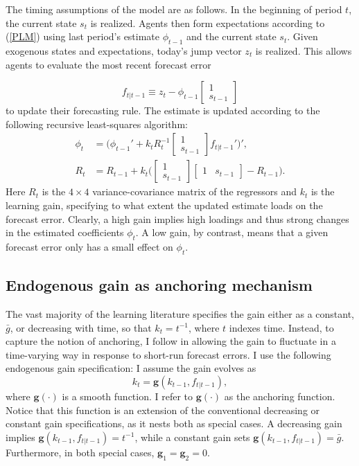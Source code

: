 \documentclass[11pt]{article}
\renewcommand{\[}{\begin{equation}}
\renewcommand{\]}{\end{equation}}
\begin{document}
The timing assumptions of the model are as follows. In the beginning of period $t$, the current state $s_t$ is realized. Agents then form expectations according to (\ref{PLM}) using last period's estimate $\phi_{t-1}$ and the current state $s_t$. Given exogenous states and expectations, today's jump vector $z_t$ is realized. This allows agents to evaluate the most recent forecast error 

\begin{equation}
f_{t|t-1} \equiv z_t - \phi_{t-1}\begin{bmatrix} 1\\ s_{t-1}\end{bmatrix} \label{fe_def}
\end{equation}
to update their forecasting rule. The estimate is updated according to the following recursive least-squares algorithm:
\begin{align}
\phi_t  & = \bigg( \phi_{t-1}' + k_t R_t^{-1}\begin{bmatrix} 1 \\ s_{t-1} \end{bmatrix}f_{t|t-1}' \bigg)' \label{RLS}, \\
R_t &= R_{t-1} +  k_t \bigg( \begin{bmatrix} 1 \\ s_{t-1} \end{bmatrix} \begin{bmatrix} 1 & s_{t-1} \end{bmatrix}  - R_{t-1} \bigg). \label{R}
\end{align}
Here $R_t$ is the $4\times 4$ variance-covariance matrix of the regressors and $k_t$ is the learning gain, specifying to what extent the updated estimate loads on the forecast error. Clearly, a high gain implies high loadings and thus strong changes in the estimated coefficients $\phi_t$. A low gain, by contrast, means that a given forecast error only has a small effect on $\phi_t$.

\subsection{Endogenous gain as anchoring mechanism}

The vast majority of the learning literature specifies the gain either as a constant, $\bar{g}$, or decreasing with time, so that $k_t = t^{-1}$, where $t$ indexes time. Instead, to capture the notion of anchoring, I follow \cite{carvalho2019anchored} in allowing the gain to fluctuate in a time-varying way in response to short-run forecast errors. I use the following endogenous gain specification: I assume the gain evolves as
\begin{equation}
k_t  = \mathbf{g}(k_{t-1},f_{t|t-1}), 
\label{anchoring}
\end{equation}
where $\mathbf{g(\cdot)}$ is a smooth function. I refer to $ \mathbf{g}(\cdot)$ as the anchoring function. Notice that this function is an extension of the conventional decreasing or constant gain specifications, as it nests both as special cases. A decreasing gain implies $\mathbf{g}(k_{t-1},f_{t|t-1})  = t^{-1}$, while a constant gain sets $\mathbf{g}(k_{t-1},f_{t|t-1})  = \bar{g}$. Furthermore, in both special cases, $\mathbf{g}_1 = \mathbf{g}_2 = 0$.
\end{document}
